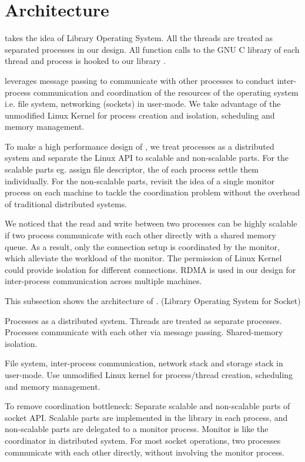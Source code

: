 \section{Architecture}
\label{sec:design}

\sys takes the idea of Library Operating System. All the threads are treated as separated processes in our design. All function calls to the GNU C library of each thread and process is hooked to our library \libipc. 

\libipc leverages message passing to communicate with other processes to conduct inter-process communication and coordination of the resources of the operating system i.e. file system, networking (sockets) in user-mode. We take advantage of the unmodified Linux Kernel for process creation and isolation, scheduling and memory management.

To make a high performance design of \libipc, we treat processes as a distributed system and separate the Linux API to scalable and non-scalable parts. For the scalable parts eg. assign file descriptor, the \libipc of each process settle them individually. For the non-scalable parts, \libipc revisit the idea of a single monitor process on each machine to tackle the coordination problem without the overhead of traditional distributed systems.

We noticed that the read and write between two processes can be highly scalable if two process communicate with each other directly with a shared memory queue. As a result, only the connection setup is coordinated by the monitor, which alleviate the workload of the monitor. The permission of Linux Kernel could provide isolation for different connections. RDMA is used in our design for inter-process communication across multiple machines.

  

This subsection shows the architecture of \sys. (Library Operating System for Socket)

Processes as a distributed system.
Threads are treated as separate processes.
Processes communicate with each other via message passing.
Shared-memory isolation.

File system, inter-process communication, network stack and storage stack in user-mode.
Use unmodified Linux kernel for process/thread creation, scheduling and memory management.

To remove coordination bottleneck:
Separate scalable and non-scalable parts of socket API.
Scalable parts are implemented in the library in each process, and non-scalable parts are delegated to a monitor process.
Monitor is like the coordinator in distributed system.
For most socket operations, two processes communicate with each other directly, without involving the monitor process.



